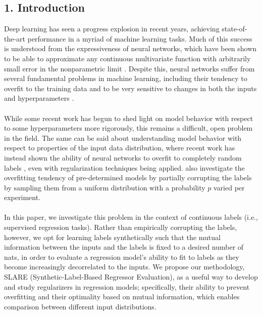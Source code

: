 \documentclass{NSF}
\begin{document}
\subsection{1. Introduction}
Deep learning \citep{lecun2015deep} has seen a progress explosion in recent years,
achieving state-of-the-art performance in a myriad of machine learning tasks. Much of
this success is understood from the expressiveness of neural networks, which have been
shown to be able to approximate any continuous multivariate function with arbitrarily
small error in the nonparametric limit
\citep{cybenko1989approximation,hornik1991approximation}. Despite this, neural networks
suffer from several fundamental problems in machine learning, including their tendency to
overfit to the training data \citep{lawrence1997lessons} and to be very sensitive to
changes in both the inputs and hyperparameters \citep{novak2018sensitivity}.
\\
\\
While some recent work has begun to shed light on model behavior with respect to some
hyperparameters \citep{jastrzkebski2017three} more rigorously, this remains a difficult,
open problem in the field. The same can be said about understanding model behavior with
respect to properties of the input data distribution, where recent work has instead shown
the ability of neural networks to overfit to completely random labels
\citep{zhang2016understanding}, even with regularization techniques being applied.
\cite{zhang2016understanding} also investigate the overfitting tendency of
pre-determined models by partially corrupting the labels by sampling them from a uniform
distribution with a probability $p$ varied per experiment.
\\
\\
In this paper, we investigate this problem in the context of continuous labels (i.e.,
supervised regression tasks). Rather than empirically corrupting the labels, however, we
opt for learning labels synthetically such that the mutual information between the inputs
and the labels is fixed to a desired number of nats, in order to evaluate a regression
model's ability to fit to labels as they become increasingly decorrelated to the inputs.
We propose our methodology, SLARE (Synthetic-Label-Based Regressor Evaluation), as a
useful way to develop and study regularizers in regression models; specifically, their
ability to prevent overfitting and their optimality based on mutual information, which
enables comparison between different input distributions.
\end{document}
